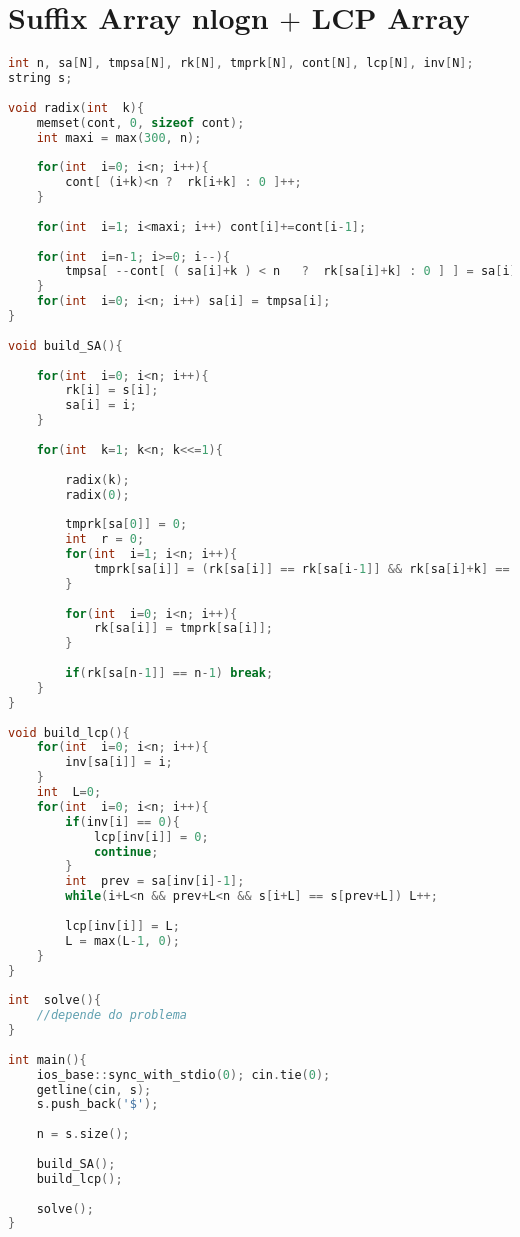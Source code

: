 \documentclass[12pt,a4paper,twoside]{report}
\begin{document}
\section{Suffix Array nlogn $+$ LCP Array}
\noindent\begin{lstlisting}[caption=Suffix Array nlogn + LCP Array,language=C++]
int n, sa[N], tmpsa[N], rk[N], tmprk[N], cont[N], lcp[N], inv[N];
string s;
 
void radix(int  k){     
    memset(cont, 0, sizeof cont);
    int maxi = max(300, n);
     
    for(int  i=0; i<n; i++){
        cont[ (i+k)<n ?  rk[i+k] : 0 ]++;
    }
     
    for(int  i=1; i<maxi; i++) cont[i]+=cont[i-1];
     
    for(int  i=n-1; i>=0; i--){
        tmpsa[ --cont[ ( sa[i]+k ) < n   ?  rk[sa[i]+k] : 0 ] ] = sa[i];
    }
    for(int  i=0; i<n; i++) sa[i] = tmpsa[i];
}
 
void build_SA(){
     
    for(int  i=0; i<n; i++){
        rk[i] = s[i];
        sa[i] = i;
    }
     
    for(int  k=1; k<n; k<<=1){
         
        radix(k);
        radix(0);
         
        tmprk[sa[0]] = 0;
        int  r = 0;
        for(int  i=1; i<n; i++){
            tmprk[sa[i]] = (rk[sa[i]] == rk[sa[i-1]] && rk[sa[i]+k] == rk[sa[i-1]+k]) ? r : ++r;
        }
         
        for(int  i=0; i<n; i++){
            rk[sa[i]] = tmprk[sa[i]];
        }
         
        if(rk[sa[n-1]] == n-1) break;
    }    
}
 
void build_lcp(){   
    for(int  i=0; i<n; i++){
        inv[sa[i]] = i;
    }
    int  L=0;
    for(int  i=0; i<n; i++){
        if(inv[i] == 0){
            lcp[inv[i]] = 0;
            continue;
        }
        int  prev = sa[inv[i]-1];
        while(i+L<n && prev+L<n && s[i+L] == s[prev+L]) L++;
         
        lcp[inv[i]] = L;
        L = max(L-1, 0);
    }
}
 
int  solve(){
    //depende do problema
}
 
int main(){
    ios_base::sync_with_stdio(0); cin.tie(0);
    getline(cin, s);
    s.push_back('$');
     
    n = s.size();
     
    build_SA();
    build_lcp();
     
    solve();
}
\end{lstlisting}
\end{document}
